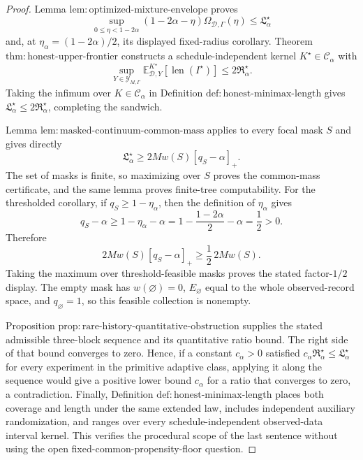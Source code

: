 \documentclass{article}
\begin{document}
\begin{proof}
Lemma \(\mathrm{lem:optimized\text{-}mixture\text{-}envelope}\) proves
\[
 \sup_{0\le\eta<1-2\alpha}
 (1-2\alpha-\eta)\Omega_{\mathcal D,\Gamma}(\eta)
 \le\mathfrak L_\alpha^\star
\]
and, at \(\eta_\alpha=(1-2\alpha)/2\), its displayed fixed-radius corollary.  Theorem \(\mathrm{thm:honest\text{-}upper\text{-}frontier}\) constructs a schedule-independent kernel \(K^\star\in\mathcal C_\alpha\) with
\[
 \sup_{Y\in\mathcal Y_{M,\Gamma}}
 \mathbb E^{K^\star}_{\mathcal D,Y}[\operatorname{len}(I^\star)]
 \le2\mathfrak R_\alpha^\star.
\]
Taking the infimum over \(K\in\mathcal C_\alpha\) in Definition \(\mathrm{def:honest\text{-}minimax\text{-}length}\) gives \(\mathfrak L_\alpha^\star\le2\mathfrak R_\alpha^\star\), completing the sandwich.

Lemma \(\mathrm{lem:masked\text{-}continuum\text{-}common\text{-}mass}\) applies to every focal mask \(S\) and gives directly
\[
 \mathfrak L_\alpha^\star\ge2Mw(S)[q_S-\alpha]_+.
\]
The set of masks is finite, so maximizing over \(S\) proves the common-mass certificate, and the same lemma proves finite-tree computability.  For the thresholded corollary, if \(q_S\ge1-\eta_\alpha\), then the definition of \(\eta_\alpha\) gives
\[
 q_S-\alpha
 \ge1-\eta_\alpha-\alpha
 =1-\frac{1-2\alpha}{2}-\alpha
 =\frac12>0.
\]
Therefore
\[
 2Mw(S)[q_S-\alpha]_+
 \ge\frac12\,2Mw(S).
\]
Taking the maximum over threshold-feasible masks proves the stated factor-\(1/2\) display.  The empty mask has \(w(\varnothing)=0\), \(E_\varnothing\) equal to the whole observed-record space, and \(q_\varnothing=1\), so this feasible collection is nonempty.

Proposition \(\mathrm{prop:rare\text{-}history\text{-}quantitative\text{-}obstruction}\) supplies the stated admissible three-block sequence and its quantitative ratio bound.  The right side of that bound converges to zero.  Hence, if a constant \(c_\alpha>0\) satisfied \(c_\alpha\mathfrak R_\alpha^\star\le\mathfrak L_\alpha^\star\) for every experiment in the primitive adaptive class, applying it along the sequence would give a positive lower bound \(c_\alpha\) for a ratio that converges to zero, a contradiction.  Finally, Definition \(\mathrm{def:honest\text{-}minimax\text{-}length}\) places both coverage and length under the same extended law, includes independent auxiliary randomization, and ranges over every schedule-independent observed-data interval kernel.  This verifies the procedural scope of the last sentence without using the open fixed-common-propensity-floor question.
\end{proof}
\end{document}
